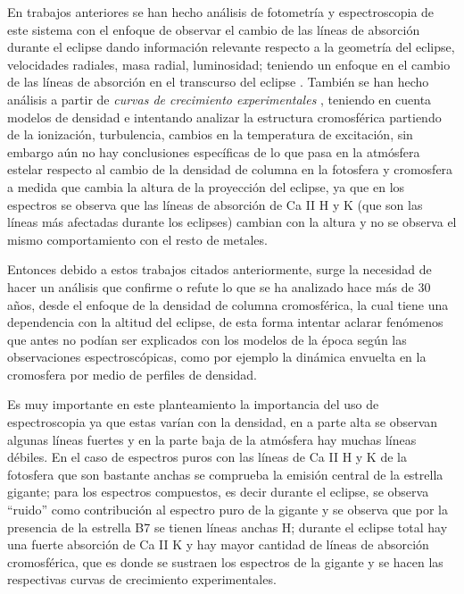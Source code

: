 \documentclass[11pt]{article}
\begin{document}
\noindent En trabajos anteriores se han hecho análisis de fotometría y espectroscopia de este sistema con el enfoque de observar el cambio de las líneas de absorción durante el eclipse dando información relevante respecto a la geometría del eclipse, velocidades radiales, masa radial, luminosidad; teniendo un enfoque en el cambio de las líneas de absorción en el transcurso del eclipse \cite{kps9}. También se han hecho análisis a partir de \textit{curvas de crecimiento experimentales} \cite{complete}, teniendo en cuenta modelos de densidad e intentando analizar la estructura cromosférica partiendo de la ionización, turbulencia, cambios en la temperatura de excitación, sin embargo aún no hay conclusiones específicas de lo que pasa en la atmósfera estelar respecto al cambio de la densidad de columna en la fotosfera y cromosfera a medida que cambia la altura de la proyección del eclipse, ya que en los espectros se observa que las líneas de absorción de Ca II H y K (que son las líneas más afectadas durante los eclipses) cambian con la altura y no se observa el mismo comportamiento con el resto de metales.

\noindent Entonces debido a estos trabajos citados anteriormente, surge la necesidad de hacer un análisis que confirme o refute lo que se ha analizado hace más de 30 años, desde el enfoque de la densidad de columna cromosférica, la cual tiene una dependencia con la altitud del eclipse, de esta forma intentar aclarar fenómenos que antes no podían ser explicados con los modelos de la época según las observaciones espectroscópicas, como por ejemplo la dinámica envuelta en la cromosfera por medio de perfiles de densidad. 

\noindent Es muy importante en este planteamiento la importancia del uso de espectroscopia ya que estas varían con la densidad, en a parte alta se observan algunas líneas fuertes y en la parte baja de la atmósfera hay muchas líneas débiles. En el caso de espectros puros con las líneas de Ca II H y K  de la fotosfera que son bastante anchas se comprueba la emisión central de la estrella gigante; para los espectros compuestos, es decir durante el eclipse, se observa ``ruido'' como contribución al espectro puro de la gigante y se observa que por la presencia de la estrella B7 se tienen líneas anchas H; durante el eclipse total hay una fuerte absorción de Ca II K y hay mayor cantidad de líneas de absorción cromosférica, que es donde se sustraen los espectros de la gigante y se hacen las respectivas curvas de crecimiento experimentales.
\end{document}
